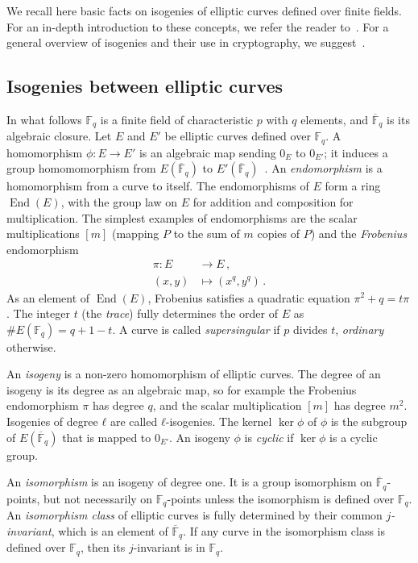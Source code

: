 \documentclass{llncs}
\newcommand{\F}{\mathbb{F}}
\newcommand{\Fbar}{\overline{\mathbb{F}}}
\DeclareMathOperator{\End}{End}
\begin{document}
We recall here basic facts on isogenies of elliptic curves defined
over finite fields. For an in-depth introduction to these concepts, we
refer the reader to~\cite{silverman:elliptic}. For a general
overview of isogenies and their use in cryptography, we
suggest~\cite{defeo2017isogenybased}.

\subsection{Isogenies between elliptic curves}
\label{sec:isogeny}

In what follows $\F_q$ is a finite field of characteristic $p$ with
$q$ elements, and $\Fbar_q$ is its algebraic closure. Let $E$ and $E'$
be elliptic curves defined over $\F_q$. 
A homomorphism $ϕ:E→E'$ is an
algebraic map sending $0_E$ to $0_{E'}$;
it induces a group homomomorphism from
$E(\Fbar_q)$ to $E'(\Fbar_q)$~\cite[III.4]{silverman:elliptic}.
An \emph{endomorphism} is a homomorphism from a curve to itself.
The endomorphisms of $E$ form a ring $\End(E)$,
with the group law on $E$ for addition
and composition for multiplication.
The simplest examples of endomorphisms
are the scalar multiplications $[m]$
(mapping $P$ to the sum of $m$ copies of $P$)
and the \emph{Frobenius} endomorphism
\begin{align*}
  π : E &\longrightarrow E \,, \\
  (x,y) &\longmapsto (x^q,y^q) \,.
\end{align*}
As an element of $\End(E)$, Frobenius satisfies a quadratic equation
$π^2 + q = tπ$.  The integer $t$ (the \emph{trace})
fully determines the order of $E$ as $\#E(\F_q)=q+1-t$. A curve is
called \emph{supersingular} if $p$ divides $t$, \emph{ordinary}
otherwise.

An \emph{isogeny} is a non-zero homomorphism of elliptic curves.
The
degree of an isogeny is its degree as an algebraic map,
so for example the Frobenius endomorphism $\pi$ has degree $q$,
and the scalar multiplication $[m]$ has degree $m^2$.
Isogenies of degree $ℓ$ are called $ℓ$-isogenies.
The kernel $\ker ϕ$ of $\phi$
is the subgroup of $E(\Fbar_q)$ that is
mapped to $0_{E'}$. 
An isogeny $ϕ$ is \emph{cyclic} 
if $\ker ϕ$ is a cyclic group.

An \emph{isomorphism} is an isogeny of degree one. It is a
group isomorphism on $\Fbar_q$-points, but not necessarily on $\F_q$-points
unless the isomorphism is defined over $\F_q$. 
An \emph{isomorphism class} of elliptic curves is
fully determined by their common \emph{$j$-invariant}, which is an
element of $\Fbar_q$. If any curve in the isomorphism class is defined
over $\F_q$, then its $j$-invariant is in $\F_q$.
\end{document}

